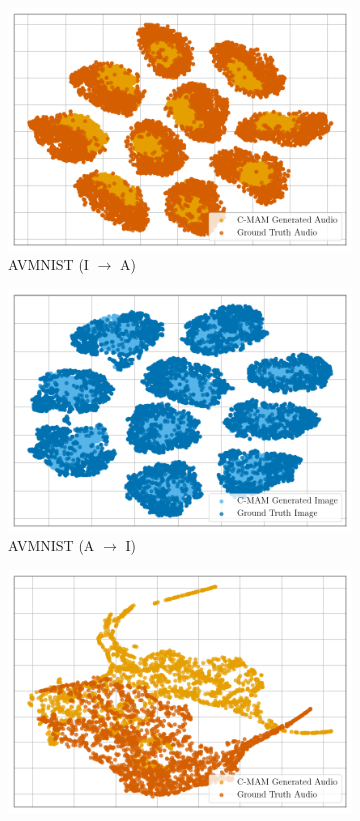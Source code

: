 \begin{figure}[!p]
\begin{subfigure}[b]{0.24\textwidth}
        \includegraphics[width=\textwidth]{imgs/tsne/avmnist_audio_cmam_1.png}
        \caption*{AVMNIST (I $\rightarrow$ A)}
    \end{subfigure}
    \begin{subfigure}[b]{0.24\textwidth}
        \centering
        \includegraphics[width=\textwidth]{imgs/tsne/avmnist_video_cmam_1.png}
        \caption*{AVMNIST (A $\rightarrow$ I)}
    \end{subfigure}
    \centering
    \begin{subfigure}[b]{0.24\textwidth}
        \centering
        \includegraphics[width=\textwidth]{imgs/tsne/ks_audio_cmam_1.png}

\end{subfigure}
\end{figure}
